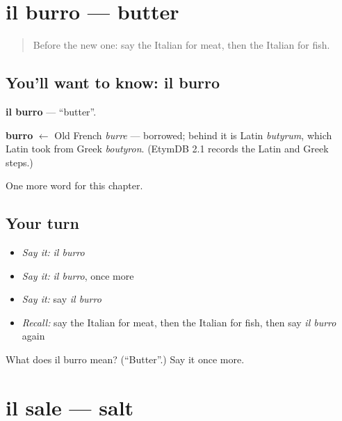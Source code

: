 \section[il burro]{il burro — butter}

\label{lesson:IT-C51-burro}



\begin{quote}
Before the new one: say the Italian for meat, then the Italian for fish.
\end{quote}

\subsection*{You'll want to know: il burro}
\textbf{il burro} — \textquotedblleft{}butter\textquotedblright{}.

\begin{cousinweb}
\textbf{burro} $\leftarrow$ Old French \emph{burre} — borrowed; behind it is Latin \emph{butyrum}, which Latin took from Greek \emph{boutyron}. (EtymDB 2.1 records the Latin and Greek steps.)
\end{cousinweb}

\begin{grammarlens}[title={What you've built}]
One more word for this chapter.
\end{grammarlens}

\subsection*{Your turn}
\begin{itemize}
\raggedright
  \item \emph{Say it:} \emph{il burro}
  \item \emph{Say it:} \emph{il burro}, once more
  \item \emph{Say it:} say \emph{il burro}
  \item \emph{Recall:} say the Italian for meat, then the Italian for fish, then say \emph{il burro} again
\end{itemize}

\begin{tcolorbox}[breakable,colback=teal!4,colframe=teal!35!black,title={Before you move on}]
What does il burro mean? (\textquotedblleft{}Butter\textquotedblright{}.) Say it once more.
\end{tcolorbox}
\section[il sale]{il sale — salt}


